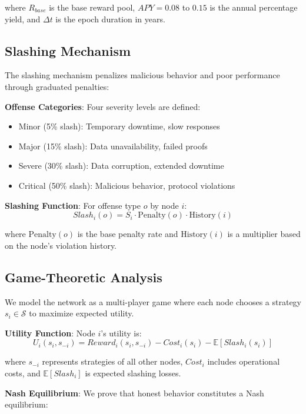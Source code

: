 \documentclass[11pt,a4paper]{article}
\begin{document}
where $R_{base}$ is the base reward pool, $APY = 0.08$ to $0.15$ is the annual percentage yield, and $\Delta t$ is the epoch duration in years.

\subsection{Slashing Mechanism}

The slashing mechanism penalizes malicious behavior and poor performance through graduated penalties:

\textbf{Offense Categories}: Four severity levels are defined:
\begin{itemize}
\item Minor (5\% slash): Temporary downtime, slow responses
\item Major (15\% slash): Data unavailability, failed proofs
\item Severe (30\% slash): Data corruption, extended downtime
\item Critical (50\% slash): Malicious behavior, protocol violations
\end{itemize}

\textbf{Slashing Function}: For offense type $o$ by node $i$:
\begin{equation}
Slash_i(o) = S_i \cdot \text{Penalty}(o) \cdot \text{History}(i)
\end{equation}

where $\text{Penalty}(o)$ is the base penalty rate and $\text{History}(i)$ is a multiplier based on the node's violation history.

\subsection{Game-Theoretic Analysis}

We model the network as a multi-player game where each node chooses a strategy $s_i \in \mathcal{S}$ to maximize expected utility.

\textbf{Utility Function}: Node $i$'s utility is:
\begin{equation}
U_i(s_i, s_{-i}) = Reward_i(s_i, s_{-i}) - Cost_i(s_i) - \mathbb{E}[Slash_i(s_i)]
\end{equation}

where $s_{-i}$ represents strategies of all other nodes, $Cost_i$ includes operational costs, and $\mathbb{E}[Slash_i]$ is expected slashing losses.

\textbf{Nash Equilibrium}: We prove that honest behavior constitutes a Nash equilibrium:
\end{document}

